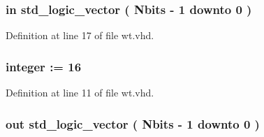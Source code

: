 \subsubsection[{M\+A\+X}]{ {\bfseries \textcolor{keywordflow}{in}\textcolor{vhdlchar}{ }} {\bfseries \textcolor{comment}{std\+\_\+logic\+\_\+vector}\textcolor{vhdlchar}{ }\textcolor{vhdlchar}{(}\textcolor{vhdlchar}{ }\textcolor{vhdlchar}{ }\textcolor{vhdlchar}{ }\textcolor{vhdlchar}{ }{\bfseries {\bf Nbits}} \textcolor{vhdlchar}{-\/}\textcolor{vhdlchar}{ } \textcolor{vhdldigit}{1} \textcolor{vhdlchar}{ }\textcolor{keywordflow}{downto}\textcolor{vhdlchar}{ }\textcolor{vhdlchar}{ } \textcolor{vhdldigit}{0} \textcolor{vhdlchar}{ }\textcolor{vhdlchar}{)}\textcolor{vhdlchar}{ }} \hspace{0.3cm}{\ttfamily [Port]}}\label{classwt_aee4ab8d7344759fe51ddf58734fd8b17}


Definition at line 17 of file wt.\+vhd.

\hypertarget{classwt_a8b45761acb3f2e683677c4eb77d442b0}{}
\subsubsection[{Nbits}]{ {\bfseries \textcolor{vhdlchar}{ }} {\bfseries \textcolor{comment}{integer}\textcolor{vhdlchar}{ }\textcolor{vhdlchar}{ }\textcolor{vhdlchar}{\+:}\textcolor{vhdlchar}{=}\textcolor{vhdlchar}{ }\textcolor{vhdlchar}{ } \textcolor{vhdldigit}{16} \textcolor{vhdlchar}{ }} \hspace{0.3cm}{\ttfamily [Generic]}}\label{classwt_a8b45761acb3f2e683677c4eb77d442b0}


Definition at line 11 of file wt.\+vhd.

\hypertarget{classwt_a44ef009b7a1d3a2266fd763d872c2b76}{}
\subsubsection[{out\+\_\+data}]{ {\bfseries \textcolor{keywordflow}{out}\textcolor{vhdlchar}{ }} {\bfseries \textcolor{comment}{std\+\_\+logic\+\_\+vector}\textcolor{vhdlchar}{ }\textcolor{vhdlchar}{(}\textcolor{vhdlchar}{ }\textcolor{vhdlchar}{ }\textcolor{vhdlchar}{ }\textcolor{vhdlchar}{ }{\bfseries {\bf Nbits}} \textcolor{vhdlchar}{-\/}\textcolor{vhdlchar}{ } \textcolor{vhdldigit}{1} \textcolor{vhdlchar}{ }\textcolor{keywordflow}{downto}\textcolor{vhdlchar}{ }\textcolor{vhdlchar}{ } \textcolor{vhdldigit}{0} \textcolor{vhdlchar}{ }\textcolor{vhdlchar}{)}\textcolor{vhdlchar}{ }} \hspace{0.3cm}{\ttfamily [Port]}}\label{classwt_a44ef009b7a1d3a2266fd763d872c2b76}


